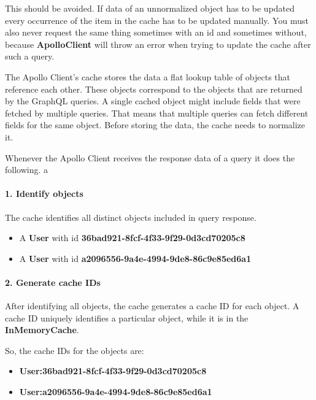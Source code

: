 This should be avoided. If data of an unnormalized object has to be updated every occurrence of the item in the cache has to be updated manually. You must also never request the same thing sometimes with an id and sometimes without, because \textbf{ApolloClient} will throw an error when trying to update the cache after such a query.

The Apollo Client's cache stores the data a flat lookup table of objects that reference each other. These objects correspond to the objects that are returned by the GraphQL queries. A single cached object might include fields that were fetched by multiple queries. That means that multiple queries can fetch different fields for the same object. Before storing the data, the cache needs to normalize it. \cite{misc:-:apollo-cache-overview}

Whenever the Apollo Client receives the response data of a query it does the following. a

\paragraph{1. Identify objects} 

The cache identifies all distinct objects included in query response.

\begin{itemize}
  \item A \textbf{User} with id \textbf{36bad921-8fcf-4f33-9f29-0d3cd70205c8}
  \item A \textbf{User} with id \textbf{a2096556-9a4e-4994-9de8-86c9e85ed6a1}
\end{itemize}

\paragraph{2. Generate cache IDs} 

After identifying all objects, the cache generates a cache ID for each object. A cache ID uniquely identifies a particular object, while it is in the \textbf{InMemoryCache}.

So, the cache IDs for the objects are: 

\begin{itemize}
  \item \textbf{User:36bad921-8fcf-4f33-9f29-0d3cd70205c8}
  \item \textbf{User:a2096556-9a4e-4994-9de8-86c9e85ed6a1}
\end{itemize}

